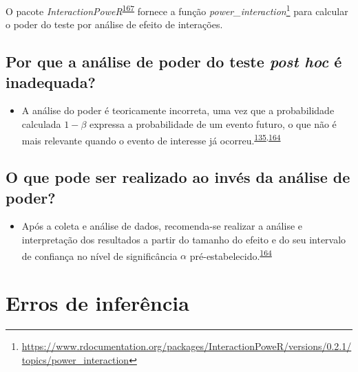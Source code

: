 \documentclass[
  a4paper,
]{book}
\providecommand{\tightlist}{%
  \setlength{\itemsep}{0pt}\setlength{\parskip}{0pt}}
\renewcommand{\href}[2]{#2\footnote{\url{#1}}}
\newenvironment{infobox}[1]
  {
  \begin{itemize}
  \renewcommand{\labelitemi}{
    \raisebox{-.7\height}[0pt][0pt]{
      {\setkeys{Gin}{width=3em,keepaspectratio}
        \texttt{[image: \#1]}}
    }
  }
  \setlength{\fboxsep}{1em}
  \begin{blackbox}
  \item
  }
  {
  \end{blackbox}
  \end{itemize}
  }
\begin{document}
\begin{infobox}{images/Rlogo}
O pacote \emph{InteractionPoweR}\textsuperscript{\protect\hyperlink{ref-InteractionPoweR}{167}} fornece a função \href{https://www.rdocumentation.org/packages/InteractionPoweR/versions/0.2.1/topics/power_interaction}{\emph{power\_interaction}} para calcular o poder do teste por análise de efeito de interações.

\end{infobox}

\hypertarget{por-que-a-anuxe1lise-de-poder-do-teste-post-hoc-uxe9-inadequada}{%
\subsection{\texorpdfstring{Por que a análise de poder do teste \emph{post hoc} é inadequada?}{Por que a análise de poder do teste post hoc é inadequada?}}\label{por-que-a-anuxe1lise-de-poder-do-teste-post-hoc-uxe9-inadequada}}

\begin{itemize}
\tightlist
\item
  A análise do poder é teoricamente incorreta, uma vez que a probabilidade calculada \(1-\beta\) expressa a probabilidade de um evento futuro, o que não é mais relevante quando o evento de interesse já ocorreu.\textsuperscript{\protect\hyperlink{ref-Cummings2003}{135},\protect\hyperlink{ref-heckman2022}{164}}
\end{itemize}

\hypertarget{o-que-pode-ser-realizado-ao-invuxe9s-da-anuxe1lise-de-poder}{%
\subsection{O que pode ser realizado ao invés da análise de poder?}\label{o-que-pode-ser-realizado-ao-invuxe9s-da-anuxe1lise-de-poder}}

\begin{itemize}
\tightlist
\item
  Após a coleta e análise de dados, recomenda-se realizar a análise e interpretação dos resultados a partir do tamanho do efeito e do seu intervalo de confiança no nível de significância \(\alpha\) pré-estabelecido.\textsuperscript{\protect\hyperlink{ref-heckman2022}{164}}
\end{itemize}

\hypertarget{erros-de-inferuxeancia}{%
\section{Erros de inferência}\label{erros-de-inferuxeancia}}
\end{document}
